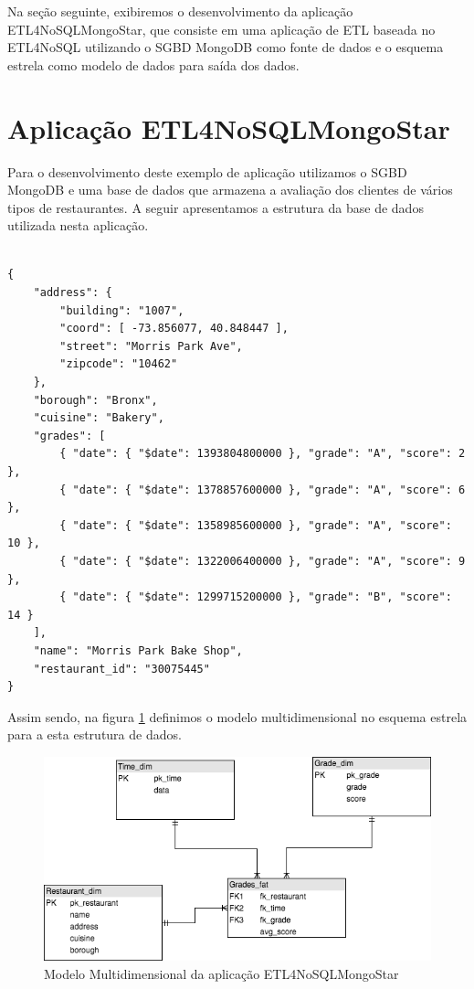 Na seção seguinte, exibiremos o desenvolvimento da aplicação ETL4NoSQLMongoStar, que consiste em uma aplicação de ETL baseada no ETL4NoSQL utilizando o SGBD MongoDB como fonte de dados e o esquema estrela como modelo de dados para saída dos dados.

\section{Aplicação ETL4NoSQLMongoStar}

Para o desenvolvimento deste exemplo de aplicação utilizamos o SGBD MongoDB e uma base de dados que armazena a avaliação dos clientes de vários tipos de restaurantes. A seguir apresentamos a estrutura da base de dados utilizada nesta aplicação.

\begin{lstlisting}[frame=single, language=Oberon-2, basicstyle=\tiny]

{
	"address": {
		"building": "1007",
		"coord": [ -73.856077, 40.848447 ],
		"street": "Morris Park Ave",
		"zipcode": "10462"
	},
	"borough": "Bronx",
	"cuisine": "Bakery",
	"grades": [
		{ "date": { "$date": 1393804800000 }, "grade": "A", "score": 2 },
		{ "date": { "$date": 1378857600000 }, "grade": "A", "score": 6 },
		{ "date": { "$date": 1358985600000 }, "grade": "A", "score": 10 },
		{ "date": { "$date": 1322006400000 }, "grade": "A", "score": 9 },
		{ "date": { "$date": 1299715200000 }, "grade": "B", "score": 14 }
	],
	"name": "Morris Park Bake Shop",
	"restaurant_id": "30075445"
}

\end{lstlisting}  

Assim sendo, na figura \ref{mongomultidim} definimos o modelo multidimensional no esquema estrela para a esta estrutura de dados.

\begin{figure}[h!]
	\centering
	\includegraphics[scale=0.5]{fig/mongo_multidim.png}
	\caption{Modelo Multidimensional da aplicação ETL4NoSQLMongoStar}
	\label{mongomultidim}
\end{figure}

